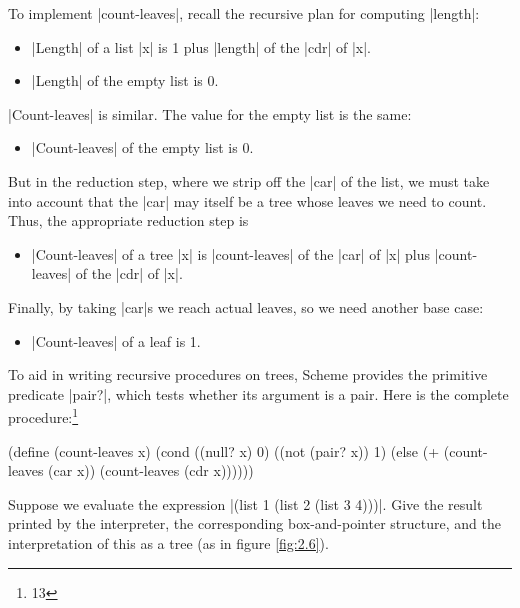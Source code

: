 To implement \scheme|count-leaves|, recall the recursive plan for computing
\scheme|length|:

\begin{itemize}
\item \scheme|Length| of a list \scheme|x| is 1 plus \scheme|length|
  of the \scheme|cdr| of \scheme|x|.

\item \scheme|Length| of the empty list is 0.
\end{itemize}

\scheme|Count-leaves| is similar.  The value for the empty list is the same:

\begin{itemize}
\item \scheme|Count-leaves| of the empty list is 0.
\end{itemize}

But in the reduction step, where we strip off the \scheme|car| of the
list, we must take into account that the \scheme|car| may itself be a
tree whose leaves we need to count.  Thus, the appropriate reduction
step is


\begin{itemize}
\item \scheme|Count-leaves| of a tree \scheme|x| is
  \scheme|count-leaves| of the \scheme|car| of \scheme|x| plus
  \scheme|count-leaves| of the \scheme|cdr| of \scheme|x|.
\end{itemize}

Finally, by taking \scheme|car|s we reach actual leaves, so we need
another base case:


\begin{itemize}
\item \scheme|Count-leaves| of a leaf is 1.
\end{itemize}

To aid in writing recursive procedures on trees, Scheme provides the
primitive predicate \scheme|pair?|, which tests whether its argument
is a pair.  Here is the complete procedure:\footnote{13}


\begin{schemedisplay}
(define (count-leaves x)
  (cond ((null? x) 0)  
        ((not (pair? x)) 1)
        (else (+ (count-leaves (car x))
                 (count-leaves (cdr x))))))
\end{schemedisplay}

\begin{Exercise}
\label{exc:2.24}
Suppose we evaluate the expression \scheme|(list 1 (list 2 (list 3 4)))|.
Give the result printed by the interpreter, the corresponding
box-and-pointer structure, and the interpretation of this as a tree
(as in figure \ref{fig:2.6}).
\end{Exercise}

